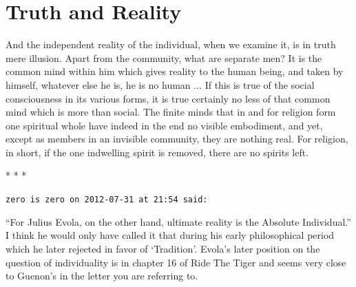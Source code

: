\section{Truth and Reality}

\begin{quotex}
And the independent reality of the individual, when we examine it, is in truth mere illusion. Apart from the community, what are separate men? It is the common mind within him which gives reality to the human being, and taken by himself, whatever else he is, he is no human ... If this is true of the social consciousness in its various forms, it is true certainly no less of that common mind which is more than social. The finite minds that in and for religion form one spiritual whole have indeed in the end no visible embodiment, and yet, except as members in an invisible community, they are nothing real. For religion, in short, if the one indwelling spirit is removed, there are no spirits left.


\end{quotex}






\begin{center}* * *\end{center}

\begin{footnotesize}
\begin{sffamily}
\texttt{zero is zero on 2012-07-31 at 21:54 said:}

``For Julius Evola, on the other hand, ultimate reality is the Absolute Individual.'' I think he would only have called it that during his early philosophical period which he later rejected in favor of `Tradition'. Evola's later position on the question of individuality is in chapter 16 of Ride The Tiger and seems very close to Guenon's in the letter you are referring to.


\hfill

\end{sffamily}
\end{footnotesize}

